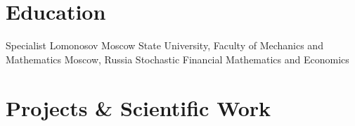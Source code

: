 \documentclass[10pt,a4paper,roman,final]{moderncv}
\begin{document}

\makecvtitle


\section{Education}


        {Specialist}
        {Lomonosov Moscow State University, Faculty of Mechanics and Mathematics}
        {Moscow, Russia}
        {Stochastic Financial Mathematics and Economics}
        {
        }





\section{Projects \& Scientific Work}

\end{document}
